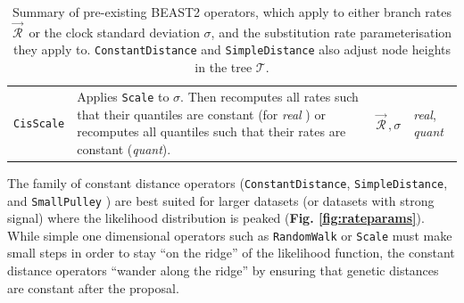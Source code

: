 \documentclass[10pt,letterpaper]{article}
\begin{document}
\begin{table}[h!]
\begin{tabular}{l p{4.2cm} l l}
 \hline
\texttt{CisScale} & Applies \texttt{Scale} to $\sigma$. Then recomputes all rates such that their quantiles are constant (for \textit{real} \cite{zhang2020improving}) or recomputes all quantiles such that their rates are constant (\textit{quant}).  & $\vec{\mathcal{R}}^{\,}, \sigma$ & \textit{real}, \textit{quant} \\
\end{tabular}
\caption{Summary of pre-existing BEAST2 operators, which apply to either branch rates $\vec{\mathcal{R}}^{\,}$ or the clock standard deviation $\sigma$, and the substitution rate parameterisation they apply to.
 \texttt{ConstantDistance} and \texttt{SimpleDistance} also adjust node heights in the tree $\mathcal{T}$. }
\label{table:kernels}
\end{table}





The family of constant distance operators (\texttt{ConstantDistance}, \texttt{SimpleDistance}, and \texttt{SmallPulley} \cite{zhang2020improving}) are best suited for larger datasets (or datasets with strong signal) where the likelihood distribution is peaked (\textbf{Fig. \ref{fig:rateparams}}).
While simple one dimensional operators such as \texttt{RandomWalk} or \texttt{Scale} must make small steps in order to stay ``on the ridge'' of the likelihood function, the constant distance operators ``wander along the ridge''  by ensuring that genetic distances are constant after the proposal.
\end{document}

